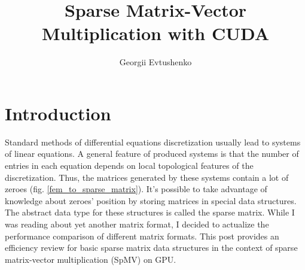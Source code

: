 \documentclass{article}
\begin{document}
\title{Sparse Matrix-Vector Multiplication with CUDA}
\author{Georgii Evtushenko}

\maketitle

\section{Introduction}

Standard methods of differential equations discretization usually lead to systems of linear equations. 
A general feature of produced systems is that the number of entries in each equation depends on local topological features of the discretization.
Thus, the matrices generated by these systems contain a lot of zeroes (fig. \ref{fem_to_sparse_matrix}). It's possible to take advantage of knowledge about zeroes' position by 
storing matrices in special data structures. The abstract data type for these structures is called the sparse matrix. While I was reading about yet another matrix format,
I decided to actualize the performance comparison of different matrix formats. This post provides an efficiency review for basic sparse matrix data structures in the context 
of sparse matrix-vector multiplication (SpMV) on GPU.
\end{document}
